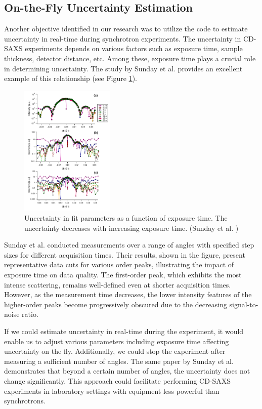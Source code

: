   \subsection{On-the-Fly Uncertainty Estimation}

  Another objective identified in our research was to utilize the code to estimate 
  uncertainty in real-time during synchrotron experiments. The uncertainty in CD-SAXS experiments 
  depends on various factors such as exposure time, sample thickness, detector distance, etc. Among 
  these, exposure time plays a crucial role in determining uncertainty. The study by Sunday et al. \cite{sunday2016evaluation} 
  provides an excellent example of this relationship (see Figure \ref{fig:exposure}).
  
  \begin{figure}[h]
  \centering
  \includegraphics[width=0.4\textwidth]{images/exposure.png}
  \caption{Uncertainty in fit parameters as a function of exposure time. The uncertainty decreases with increasing exposure time. (Sunday et al. \cite{sunday2016evaluation})}
  \label{fig:exposure}
  \end{figure}
  
  Sunday et al. conducted measurements over a range of angles with specified step sizes for different 
  acquisition times. Their results, shown in the figure, present representative data cuts for various 
  order peaks, illustrating the impact of exposure time on data quality. The first-order peak, which 
  exhibits the most intense scattering, remains well-defined even at shorter acquisition times. However, 
  as the measurement time decreases, the lower intensity features of the higher-order peaks become 
  progressively obscured due to the decreasing signal-to-noise ratio.
  
  If we could estimate uncertainty in real-time during the experiment, it would enable us to adjust 
  various parameters including exposure time affecting uncertainty on the fly. Additionally, we could stop the experiment 
  after measuring a sufficient number of angles. The same paper by Sunday et al. demonstrates that 
  beyond a certain number of angles, the uncertainty does not change significantly. This approach 
  could facilitate performing CD-SAXS experiments in laboratory settings with equipment less powerful 
  than synchrotrons.
  
